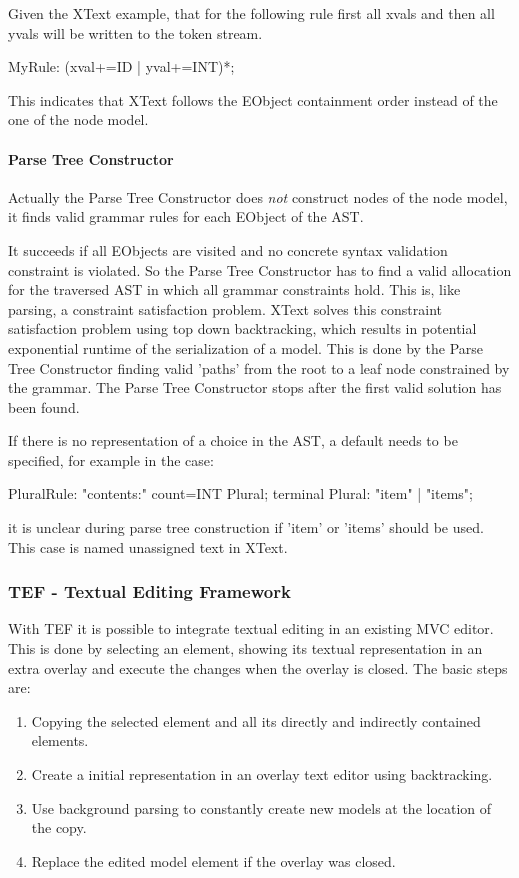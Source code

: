 Given the XText example, that for the following rule first all xvals and then all yvals will be written to the token stream.
\begin{xtxt}
MyRule: (xval+=ID | yval+=INT)*; 
\end{xtxt}
This indicates that XText follows the EObject containment order instead of the one of the node model.

\paragraph{Parse Tree Constructor}  \label{xtxt:ptc}
Actually the Parse Tree Constructor does \emph{not} construct nodes of the node model, it finds valid grammar rules for each EObject of the AST. 

It succeeds if all EObjects are visited and no concrete syntax validation constraint is violated. So the Parse Tree Constructor has to find a valid allocation for the traversed AST in which all grammar constraints hold.  This is, like parsing, a constraint satisfaction problem. XText solves this constraint satisfaction problem using top down backtracking, which results in potential exponential runtime of the serialization of a model. This is done by the Parse Tree Constructor finding valid 'paths' from the root to a leaf node constrained by the grammar. The Parse Tree Constructor stops after the first valid solution has been found. 

If there is no representation of a choice in the AST, a default needs to be specified, for example in the case: 
\begin{xtxt}
PluralRule: "contents:" count=INT Plural;
terminal Plural: "item" | "items";
\end{xtxt}
it is unclear during parse tree construction if 'item' or 'items' should be used. This case is named unassigned text in XText.



\subsubsection{TEF - Textual Editing Framework}
With TEF it is possible to integrate textual editing in an existing MVC editor. This is done by selecting an element, showing its textual representation in an extra overlay and execute the changes when the overlay is closed. 
The basic steps are:
\begin{enumerate}
	\item Copying the selected element and all its directly and indirectly contained elements.
	\item Create a initial representation in an overlay text editor using backtracking.
	\item Use background parsing to constantly create new models at the location of the copy.
	\item Replace the edited model element if the overlay was closed.
\end{enumerate}

